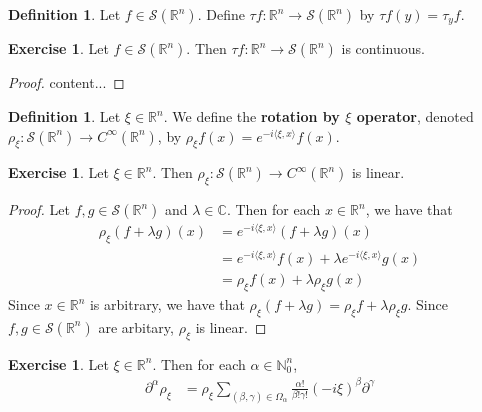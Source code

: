 \documentclass{book}
\theoremstyle{definition}
\newtheorem{defn}[definition]{Definition}
\newtheorem{ex}[definition]{Exercise}
\newcommand{\al}{\alpha}
\newcommand{\be}{\beta}
\newcommand{\gam}{\gamma}
\newcommand{\lam}{\lambda}
\newcommand{\Om}{\Omega}
\newcommand{\C}{\mathbb{C}}
\newcommand{\N}{\mathbb{N}}
\newcommand{\R}{\mathbb{R}}
\newcommand{\MS}{\mathcal{S}}
\DeclareMathOperator*{\0}{\mbf{0}}
\DeclareMathOperator*{\1}{\mbf{1}}
\renewcommand{\r}{\rangle}
\renewcommand{\l}{\langle}
\newcommand{\p}{\partial}
\begin{document}
	\begin{defn}
		Let $f \in \MS(\R^n)$. Define $\tau f: \R^n \rightarrow \MS(\R^n)$ by $\tau f(y) = \tau_y f$. 
	\end{defn}
	
	\begin{ex}
		Let $f \in \MS(\R^n)$. Then $\tau f : \R^n \rightarrow \MS(\R^n)$ is continuous.
	\end{ex}
	
	\begin{proof}
		content...
	\end{proof}


	\begin{defn}
		Let $\xi \in \R^n$. We define the \textbf{rotation by $\xi$ operator}, denoted $\rho_{\xi}: \MS(\R^n) \rightarrow C^{\infty}(\R^n)$, by $\rho_{\xi}f(x) = e^{-i \l \xi, x \r }f(x)$.
	\end{defn}

	\begin{ex}
		Let $\xi \in \R^n$. Then $\rho_{\xi}: \MS(\R^n) \rightarrow C^{\infty}(\R^n)$ is linear.
	\end{ex}

	\begin{proof}
		Let $f, g \in \MS(\R^n)$ and $\lam \in \C$. Then for each $x \in \R^n$, we have that
		\begin{align*}
			\rho_{\xi}(f + \lam g)(x) 
			& = e^{-i \l \xi, x\r}(f+ \lam g)(x) \\
			& = e^{-i \l \xi, x\r}f(x) + \lam e^{-i \l \xi, x\r} g(x) \\
			& = \rho_{\xi}f (x) + \lam \rho_{\xi} g(x)
		\end{align*}
		Since $x \in \R^n$ is arbitrary, we have that $\rho_{\xi} (f + \lam g) = \rho_{\xi} f + \lam \rho_{\xi} g$. Since $f, g \in \MS(\R^n)$ are arbitary, $\rho_{\xi}$ is linear. 
	\end{proof}

	\begin{ex}
		Let $\xi \in \R^n$. Then for each $\al \in \N_0^n$,  
		\begin{align*}
			\p^{\al} \rho_{\xi}
			& =   \rho_{\xi}  \sum_{(\be, \gam) \in \Om_{\al}} \frac{\al!}{\be! \gam!} (-i \xi)^{\be}  \p^{\gam} 
		\end{align*}
	\end{ex}
	
\end{document}
